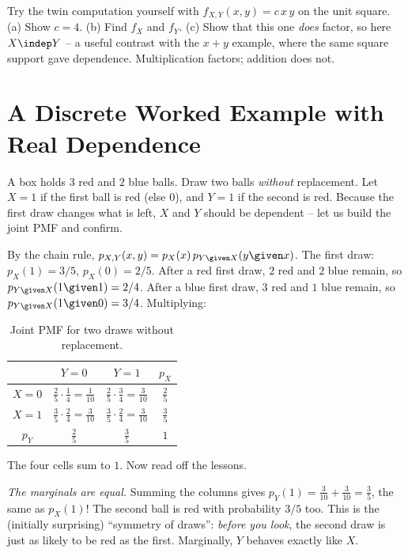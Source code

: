 \begin{labbox}
Try the twin computation yourself with $f_{X,Y}(x,y) = c\,x\,y$ on the unit
square. (a) Show $c=4$. (b) Find $f_X$ and $f_Y$. (c) Show that this one
\emph{does} factor, so here $X\indep Y$ -- a useful contrast with the $x+y$
example, where the same square support gave dependence. Multiplication factors;
addition does not.
\end{labbox}

\section{A Discrete Worked Example with Real Dependence}
\label{ch13:worked-discrete}

\begin{example}
\label{ch13:ex-without-replacement}
A box holds $3$ red and $2$ blue balls. Draw two balls \emph{without}
replacement. Let $X=1$ if the first ball is red (else $0$), and $Y=1$ if the
second is red. Because the first draw changes what is left, $X$ and $Y$ should be
dependent -- let us build the joint PMF and confirm.

By the chain rule, $p_{X,Y}(x,y) = p_X(x)\,p_{Y\given X}(y\given x)$. The first
draw: $p_X(1) = 3/5$, $p_X(0) = 2/5$. After a red first draw, $2$ red and $2$
blue remain, so $p_{Y\given X}(1\given 1) = 2/4$. After a blue first draw, $3$ red
and $1$ blue remain, so $p_{Y\given X}(1\given 0) = 3/4$. Multiplying:

\begin{table}[H]
\centering
\begin{tabular}{c|cc|c}
 & $Y=0$ & $Y=1$ & $p_X$ \\
\hline
$X=0$ & $\tfrac{2}{5}\cdot\tfrac14 = \tfrac{1}{10}$
      & $\tfrac{2}{5}\cdot\tfrac34 = \tfrac{3}{10}$ & $\tfrac{2}{5}$ \\[0.6ex]
$X=1$ & $\tfrac{3}{5}\cdot\tfrac24 = \tfrac{3}{10}$
      & $\tfrac{3}{5}\cdot\tfrac24 = \tfrac{3}{10}$ & $\tfrac{3}{5}$ \\[0.6ex]
\hline
$p_Y$ & $\tfrac{2}{5}$ & $\tfrac{3}{5}$ & $1$ \\
\end{tabular}
\caption{Joint PMF for two draws without replacement.}
\label{ch13:tab-without-replacement}
\end{table}

The four cells sum to $1$. Now read off the lessons.

\emph{The marginals are equal.} Summing the columns gives
$p_Y(1) = \tfrac{3}{10}+\tfrac{3}{10} = \tfrac{3}{5}$, the same as $p_X(1)$! The
second ball is red with probability $3/5$ too. This is the (initially surprising)
``symmetry of draws'': \emph{before you look}, the second draw is just as likely
to be red as the first. Marginally, $Y$ behaves exactly like $X$.


\end{example}
